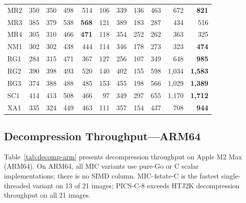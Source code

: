 \documentclass[journal]{IEEEtran}
\begin{document}
\begin{table}[htbp]
\begin{tabular}{lrrrrrrrrrr}
MR2 & 350 & 350 & 498 & 514 & 106 & 339 & 136 & 463 & 672 & \textbf{821} \\
MR3 & 385 & 379 & 538 & \textbf{568} & 121 & 389 & 183 & 287 & 434 & 516 \\
MR4 & 305 & 310 & 466 & \textbf{471} & 118 & 354 & 252 & 262 & 363 & 325 \\
NM1 & 302 & 302 & 438 & 444 & 114 & 346 & 178 & 273 & 323 & \textbf{474} \\
RG1 & 284 & 315 & 471 & 367 & 127 & 256 & 107 & 349 & 648 & \textbf{985} \\
RG2 & 390 & 398 & 493 & 520 & 140 & 402 & 155 & 598 & 1,034 & \textbf{1,583} \\
RG3 & 374 & 388 & 488 & 485 & 153 & 455 & 198 & 566 & 1,029 & \textbf{1,389} \\
SC1 & 414 & 413 & 508 & 466 & 97 & 349 & 297 & 655 & 1,170 & \textbf{1,712} \\
XA1 & 335 & 324 & 449 & 463 & 111 & 357 & 154 & 437 & 708 & \textbf{944} \\
\bottomrule
\end{tabular}
\end{table}

\subsection{Decompression Throughput---ARM64}

Table~\ref{tab:decomp-arm} presents decompression throughput on Apple M2 Max
(ARM64). On ARM64, all MIC variants use pure-Go or C scalar implementations;
there is no SIMD column. MIC-4state-C is the fastest single-threaded variant
on 13 of 21 images; PICS-C-8 exceeds HTJ2K decompression throughput on all
21 images.
\end{document}
